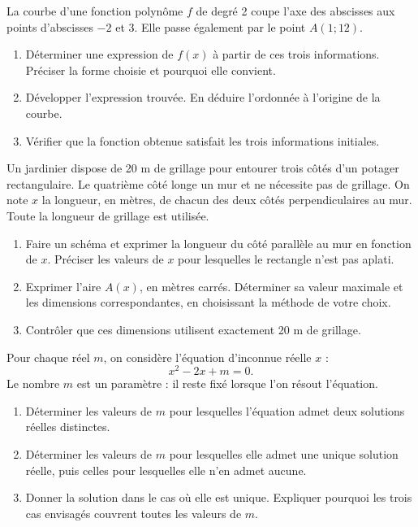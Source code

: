 La courbe d’une fonction polynôme $f$ de degré 2 coupe l’axe des abscisses aux points d’abscisses $-2$ et 3. Elle passe également par le point $A(1;12)$.
\begin{enumerate}[label=\arabic*.]
\item Déterminer une expression de $f(x)$ à partir de ces trois informations. Préciser la forme choisie et pourquoi elle convient.
\item Développer l’expression trouvée. En déduire l’ordonnée à l’origine de la courbe.
\item Vérifier que la fonction obtenue satisfait les trois informations initiales.
\end{enumerate}
Un jardinier dispose de 20 m de grillage pour entourer trois côtés d’un potager rectangulaire. Le quatrième côté longe un mur et ne nécessite pas de grillage. On note $x$ la longueur, en mètres, de chacun des deux côtés perpendiculaires au mur. Toute la longueur de grillage est utilisée.
\begin{enumerate}[label=\arabic*.]
\item Faire un schéma et exprimer la longueur du côté parallèle au mur en fonction de $x$. Préciser les valeurs de $x$ pour lesquelles le rectangle n’est pas aplati.
\item Exprimer l’aire $A(x)$, en mètres carrés. Déterminer sa valeur maximale et les dimensions correspondantes, en choisissant la méthode de votre choix.
\item Contrôler que ces dimensions utilisent exactement 20 m de grillage.
\end{enumerate}

Pour chaque réel $m$, on considère l’équation d’inconnue réelle $x$ :\[x^2-2x+m=0.\]Le nombre $m$ est un paramètre : il reste fixé lorsque l’on résout l’équation.
\begin{enumerate}[label=\arabic*.]
\item Déterminer les valeurs de $m$ pour lesquelles l’équation admet deux solutions réelles distinctes.
\item Déterminer les valeurs de $m$ pour lesquelles elle admet une unique solution réelle, puis celles pour lesquelles elle n’en admet aucune.
\item Donner la solution dans le cas où elle est unique. Expliquer pourquoi les trois cas envisagés couvrent toutes les valeurs de $m$.
\end{enumerate}

